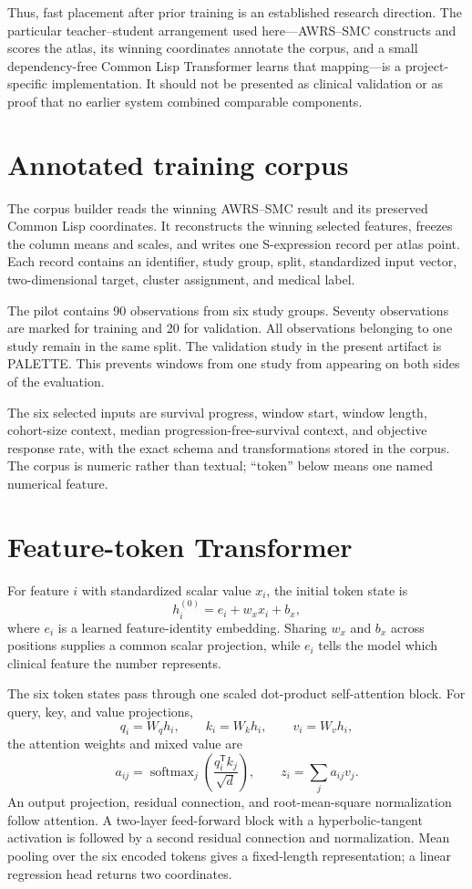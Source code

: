 \documentclass[12pt]{article}
\begin{document}
Thus, fast placement after prior training is an established research direction.
The particular teacher--student arrangement used here---AWRS--SMC constructs and
scores the atlas, its winning coordinates annotate the corpus, and a small
dependency-free Common Lisp Transformer learns that mapping---is a project-specific
implementation.  It should not be presented as clinical validation or as proof
that no earlier system combined comparable components.

\section{Annotated training corpus}

The corpus builder reads the winning AWRS--SMC result and its preserved Common
Lisp coordinates.  It reconstructs the winning selected features, freezes the
column means and scales, and writes one S-expression record per atlas point.  Each
record contains an identifier, study group, split, standardized input vector,
two-dimensional target, cluster assignment, and medical label.

The pilot contains 90 observations from six study groups.  Seventy observations
are marked for training and 20 for validation.  All observations belonging to one
study remain in the same split.  The validation study in the present artifact is
PALETTE.  This prevents windows from one study from appearing on both sides of the
evaluation.

The six selected inputs are survival progress, window start, window length,
cohort-size context, median progression-free-survival context, and objective
response rate, with the exact schema and transformations stored in the corpus.
The corpus is numeric rather than textual; ``token'' below means one named
numerical feature.

\section{Feature-token Transformer}

For feature $i$ with standardized scalar value $x_i$, the initial token state is
\[
  h_i^{(0)}=e_i+w_x x_i+b_x,
\]
where $e_i$ is a learned feature-identity embedding.  Sharing $w_x$ and $b_x$
across positions supplies a common scalar projection, while $e_i$ tells the model
which clinical feature the number represents.

The six token states pass through one scaled dot-product self-attention block.
For query, key, and value projections,
\[
  q_i=W_qh_i,\qquad k_i=W_kh_i,\qquad v_i=W_vh_i,
\]
the attention weights and mixed value are
\[
  a_{ij}=\operatorname{softmax}_j
  \left(\frac{q_i^{\mathsf T}k_j}{\sqrt{d}}\right),\qquad
  z_i=\sum_j a_{ij}v_j.
\]
An output projection, residual connection, and root-mean-square normalization
follow attention.  A two-layer feed-forward block with a hyperbolic-tangent
activation is followed by a second residual connection and normalization.  Mean
pooling over the six encoded tokens gives a fixed-length representation; a linear
regression head returns two coordinates.
\end{document}
